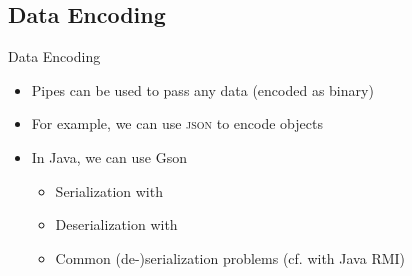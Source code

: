 {\subsection{Data Encoding}
\begin{frame}[fragile]{Data Encoding}
   \begin{itemize}[<+(1)->]
      \itemsep12pt
      \item Pipes can be used to pass any data (encoded as binary)
      \item For example, we can use \textsc{json} to encode objects
      \item In Java, we can use Gson \begin{itemize}
         \itemsep2pt
         \item Serialization with 
         \item Deserialization with 
         \item Common (de-)serialization problems (cf.  with Java RMI) %
      \end{itemize}
   \end{itemize}
\end{frame}
\SidebarReset
}

